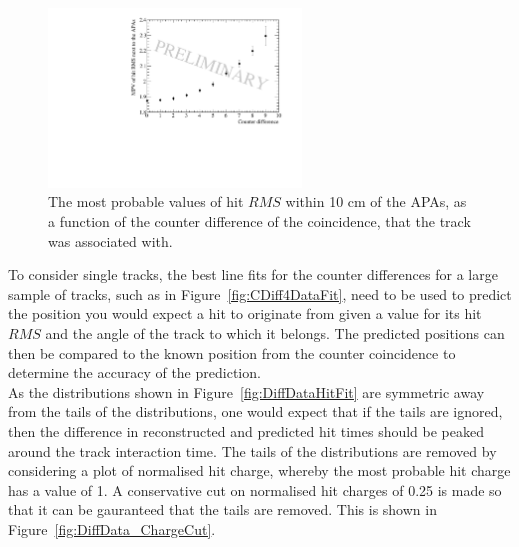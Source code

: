 \begin{figure}[h!]
  \centering
  \includegraphics[width=0.6\textwidth]{InterceptCanvasData}
  \caption[The angular dependence of diffusion in the 35 ton dataset for hits within 10 cm of the APAs]
          {The most probable values of hit $RMS$ within 10 cm of the APAs, as a function of the counter difference of the coincidence, that the track was associated with.}
  \label{fig:DiffData_AngFit}
\end{figure}

To consider single tracks, the best line fits for the counter differences for a large sample of tracks, such as in Figure~\ref{fig:CDiff4DataFit}, need to be used to predict the position you would expect a hit to originate from given a value for its hit $RMS$ and the angle of the track to which it belongs. The predicted positions can then be compared to the known position from the counter coincidence to determine the accuracy of the prediction. \\

As the distributions shown in Figure~\ref{fig:DiffDataHitFit} are symmetric away from the tails of the distributions, one would expect that if the tails are ignored, then the difference in reconstructed and predicted hit times should be peaked around the track interaction time. The tails of the distributions are removed by considering a plot of normalised hit charge, whereby the most probable hit charge has a value of 1. A conservative cut on normalised hit charges of 0.25 is made so that it can be gauranteed that the tails are removed. This is shown in Figure~\ref{fig:DiffData_ChargeCut}. \\

